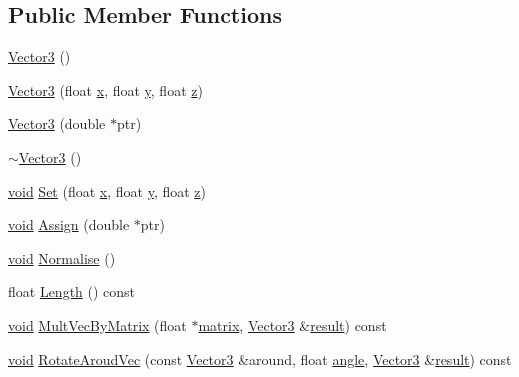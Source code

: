 \subsection*{Public Member Functions}
\begin{DoxyCompactItemize}
\item 
\hyperlink{class_vector3_a0f49191f7e001e7f7ae1cb49522118b4}{Vector3} ()
\item 
\hyperlink{class_vector3_ad53e22b52babdb90d423601f72467590}{Vector3} (float \hyperlink{glext_8h_ad77deca22f617d3f0e0eb786445689fc}{x}, float \hyperlink{glext_8h_a9298c7ad619074f5285b32c6b72bfdea}{y}, float \hyperlink{glext_8h_a1483160fae141afea848a5393c286b2b}{z})
\item 
\hyperlink{class_vector3_a3d6a5af145dc779c7d61352f95386bc5}{Vector3} (double $\ast$ptr)
\item 
\hyperlink{class_vector3_a5545e13e2e2861ece8f14b12a6a8101f}{$\sim$\+Vector3} ()
\item 
\hyperlink{wglext_8h_a9e6b7f1933461ef318bb000d6bd13b83}{void} \hyperlink{class_vector3_a83547b4ef551fd45456a4106c178ca27}{Set} (float \hyperlink{glext_8h_ad77deca22f617d3f0e0eb786445689fc}{x}, float \hyperlink{glext_8h_a9298c7ad619074f5285b32c6b72bfdea}{y}, float \hyperlink{glext_8h_a1483160fae141afea848a5393c286b2b}{z})
\item 
\hyperlink{wglext_8h_a9e6b7f1933461ef318bb000d6bd13b83}{void} \hyperlink{class_vector3_ab016fd3f3dc962c2c496b61fc78f3610}{Assign} (double $\ast$ptr)
\item 
\hyperlink{wglext_8h_a9e6b7f1933461ef318bb000d6bd13b83}{void} \hyperlink{class_vector3_ab6f156446cbef2ebc0c84d73b8cad23a}{Normalise} ()
\item 
float \hyperlink{class_vector3_a1e3ec2e499cb73c156ce9bc1198481d2}{Length} () const 
\item 
\hyperlink{wglext_8h_a9e6b7f1933461ef318bb000d6bd13b83}{void} \hyperlink{class_vector3_a86513faf42cf06f6c4d379b048a61d6f}{Mult\+Vec\+By\+Matrix} (float $\ast$\hyperlink{glext_8h_a7b24a3f2f56eb1244ae69dacb4fecb6f}{matrix}, \hyperlink{class_vector3}{Vector3} \&\hyperlink{glext_8h_a321ff419cd5252e54cf95e64dc6687ee}{result}) const 
\item 
\hyperlink{wglext_8h_a9e6b7f1933461ef318bb000d6bd13b83}{void} \hyperlink{class_vector3_a310883f49b5c0ffa5d75b83cc0a2b7c0}{Rotate\+Aroud\+Vec} (const \hyperlink{class_vector3}{Vector3} \&around, float \hyperlink{glext_8h_a9e06c1f76a20fed54ca742cd25cb02c4}{angle}, \hyperlink{class_vector3}{Vector3} \&\hyperlink{glext_8h_a321ff419cd5252e54cf95e64dc6687ee}{result}) const 

\end{DoxyCompactItemize}
